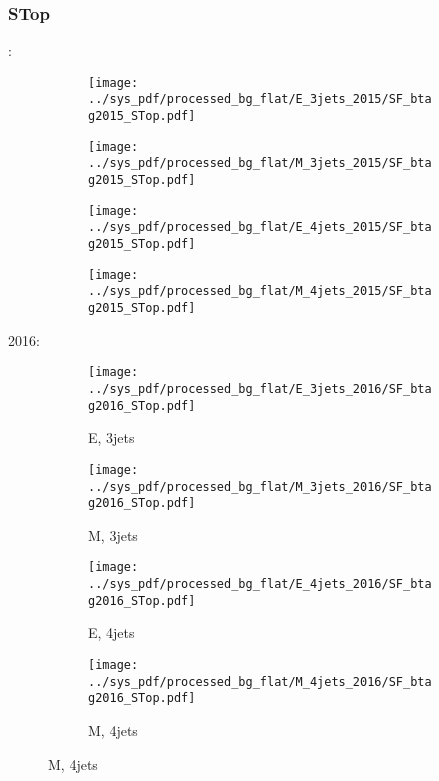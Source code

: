 \documentclass{beamer}
\begin{document}
\begin{frame}
\frametitle{STop}
\fontsize{5}{1}:
\begin{figure}
\centering
\begin{subfigure}[b]{0.24\textwidth}
\texttt{[image: ../sys\_pdf/processed\_bg\_flat/E\_3jets\_2015/SF\_btag2015\_STop.pdf]}
\end{subfigure}
\begin{subfigure}[b]{0.24\textwidth}
\texttt{[image: ../sys\_pdf/processed\_bg\_flat/M\_3jets\_2015/SF\_btag2015\_STop.pdf]}
\end{subfigure}
\begin{subfigure}[b]{0.24\textwidth}
\texttt{[image: ../sys\_pdf/processed\_bg\_flat/E\_4jets\_2015/SF\_btag2015\_STop.pdf]}
\end{subfigure}
\begin{subfigure}[b]{0.24\textwidth}
\texttt{[image: ../sys\_pdf/processed\_bg\_flat/M\_4jets\_2015/SF\_btag2015\_STop.pdf]}
\end{subfigure}
\end{figure}
2016:
\begin{figure}
\centering
\begin{subfigure}[b]{0.24\textwidth}
\texttt{[image: ../sys\_pdf/processed\_bg\_flat/E\_3jets\_2016/SF\_btag2016\_STop.pdf]}
\captionsetup{font=tiny}
\caption{E, 3jets}
\end{subfigure}
\begin{subfigure}[b]{0.24\textwidth}
\texttt{[image: ../sys\_pdf/processed\_bg\_flat/M\_3jets\_2016/SF\_btag2016\_STop.pdf]}
\captionsetup{font=tiny}
\caption{M, 3jets}
\end{subfigure}
\begin{subfigure}[b]{0.24\textwidth}
\texttt{[image: ../sys\_pdf/processed\_bg\_flat/E\_4jets\_2016/SF\_btag2016\_STop.pdf]}
\captionsetup{font=tiny}
\caption{E, 4jets}
\end{subfigure}
\begin{subfigure}[b]{0.24\textwidth}
\texttt{[image: ../sys\_pdf/processed\_bg\_flat/M\_4jets\_2016/SF\_btag2016\_STop.pdf]}
\captionsetup{font=tiny}
\caption{M, 4jets}
\end{subfigure}
\end{figure}
\end{frame}
\end{document}

